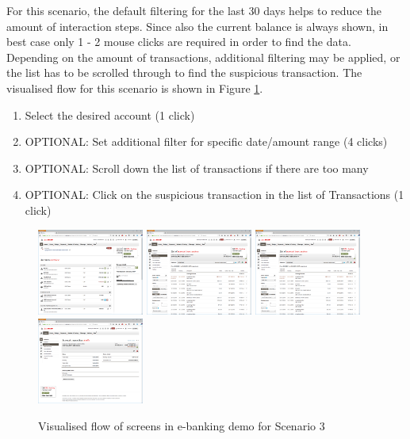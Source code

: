 For this scenario, the default filtering for the last 30 days helps to reduce the amount of interaction steps. Since also the current balance is always shown, in best case only 1 - 2 mouse clicks are required in order to find the data. Depending on the amount of transactions, additional filtering may be applied, or the list has to be scrolled through to find the suspicious transaction. The visualised flow for this scenario is shown in Figure \ref{fig:scenariothreeebanking}.
\begin{enumerate}
	\item Select the desired account (1 click)
	\item OPTIONAL: Set additional filter for specific date/amount range (4 clicks)
	\item OPTIONAL: Scroll down the list of transactions if there are too many
	\item OPTIONAL: Click on the suspicious transaction in the list of Transactions (1 click)
\end{enumerate}
\begin{figure}[h]
	\begin{center}
		\includegraphics[width=3.5cm]{03_Figures/09_Evaluation/UBS_1_Overview.png}
		\includegraphics[width=3.5cm]{03_Figures/09_Evaluation/UBS_3_AccountTransactions.png}
		\includegraphics[width=3.5cm]{03_Figures/09_Evaluation/UBS_3_AccountTransactions.png}
		\includegraphics[width=3.5cm]{03_Figures/09_Evaluation/UBS_4_AccountTransactionDetails.png}
		\caption{Visualised flow of screens in e-banking demo for Scenario 3}
		\label{fig:scenariothreeebanking}
	\end{center}
\end{figure}

